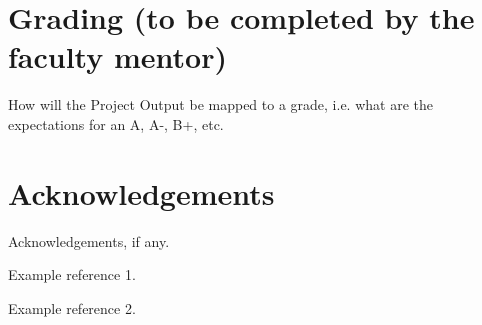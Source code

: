 \documentclass[12pt]{article}
\begin{document}
\section{Grading (to be completed by the faculty mentor)}
How will the Project Output be mapped to a grade, i.e. what are the expectations for an A, A-, B+, etc.

\pagebreak

\section*{Acknowledgements}
Acknowledgements, if any.

\begin{thebibliography}{9}
  Example reference 1.
  
  Example reference 2.
\end{thebibliography}
\end{document}
